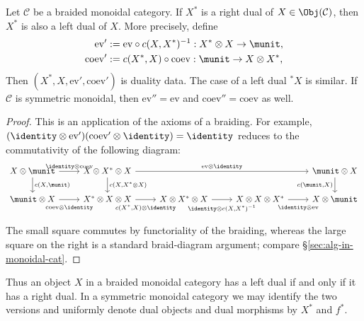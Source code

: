 \begin{lemma}\label{prop:braided-dual}
	Let $\mathcal{C}$ be a braided monoidal category. If $X^*$ is a right dual
	of $X\in\Obj(\mathcal{C})$, then $X^*$ is also a left dual of $X$. More
	precisely, define
	\begin{align*}
		\mathrm{ev}' & := \mathrm{ev} \circ c(X, X^*)^{-1}: X^* \otimes X \to \munit, \\
		\mathrm{coev}' & := c(X^*, X) \circ \mathrm{coev}: \munit \to X \otimes X^* ,
	\end{align*}
	Then $(X^*,X,\mathrm{ev}',\mathrm{coev}')$ is duality data. The case of a
left dual ${}^*X$ is similar. If $\mathcal{C}$ is symmetric monoidal, then
$\mathrm{ev}''=\mathrm{ev}$ and $\mathrm{coev}''=\mathrm{coev}$ as well.
\end{lemma}
\begin{proof}
	This is an application of the axioms of a braiding. For example,
	$(\identity\otimes\mathrm{ev}')(\mathrm{coev}'\otimes\identity)
	=\identity$ reduces to the commutativity of the following diagram:
	\[\begin{tikzcd}
		X \otimes \munit \arrow[d, "{c(X, \munit)}"] \arrow[r, "{\identity \otimes \mathrm{coev}}"] & X \otimes X^* \otimes X \arrow[d, "{c(X, X^* \otimes X)}"] \arrow[rrr, "{\mathrm{ev} \otimes \identity}"] & & & \munit \otimes X \arrow[d, "{c(\munit, X)}"'] \\
		\munit \otimes X \arrow[r, "{\mathrm{coev} \otimes \identity}"' inner sep=0.6em] & X^* \otimes X \otimes X \arrow[r, "{c(X^*, X) \otimes \identity}"' inner sep=0.6em] & X \otimes X^* \otimes X \arrow[r, "{\identity \otimes c(X, X^*)^{-1}}"' inner sep=0.6em] & X \otimes X \otimes X^* \arrow[r, "{\identity \otimes \mathrm{ev}}"' inner sep=0.6em] & X \otimes \munit
	\end{tikzcd}\]
	The small square commutes by functoriality of the braiding, whereas the
large square on the right is a standard braid-diagram argument; compare
\S\ref{sec:alg-in-monoidal-cat}.
\end{proof}

Thus an object $X$ in a braided monoidal category has a left dual if and only
if it has a right dual. In a symmetric monoidal category we may identify the
two versions and uniformly denote dual objects and dual morphisms by $X^*$
and $f^*$.

